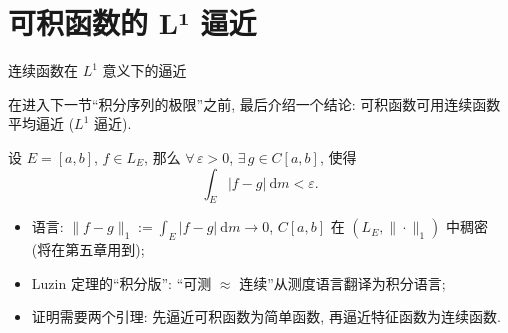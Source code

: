 
\section[L¹ 逼近]{可积函数的 L¹ 逼近}


\begin{frame}{连续函数在 $L^1$ 意义下的逼近}

在进入下一节``积分序列的极限''之前, 最后介绍一个结论: \alert{可积函数可用连续函数平均逼近}
($L^1$ 逼近).

\begin{thm}
设 $E = [a, b]$, $f \in L_E$, 那么 $\forall\, \varepsilon > 0$, $\exists\, g \in C[a, b]$, 使得
\[
\int_E |f - g| ~ \mathrm{d} m < \varepsilon .
\]
\end{thm}

\pause

\begin{itemize}
\item 语言: $\|f - g\|_1 := \int_E |f - g| ~ \mathrm{d} m \to 0$,
  $C[a, b]$ 在 $(L_E, \|\cdot\|_1)$ 中\alert{稠密} (将在第五章用到);
\item Luzin 定理的``积分版'': ``可测 $\approx$ 连续''从测度语言翻译为积分语言;
\item 证明需要两个引理: 先逼近\alert{可积函数}为简单函数, 再逼近\alert{特征函数}为连续函数.
\end{itemize}

\end{frame}


